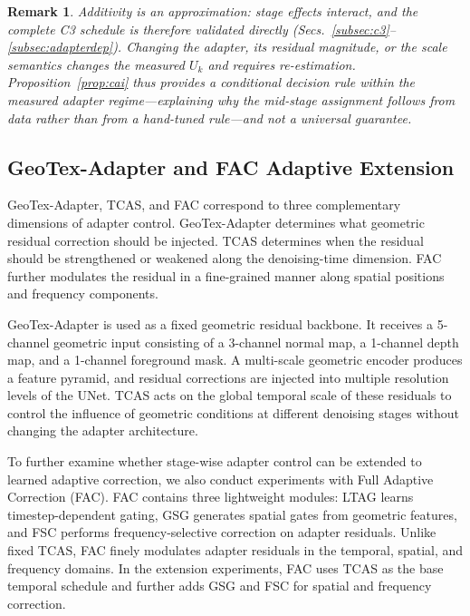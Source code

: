 \documentclass[times,twocolumn,final]{elsarticle}
\newtheorem{remark}{Remark} %
\providecommand{\DIFadd}[1]{{\protect\color{blue} \sf #1}} %
\providecommand{\DIFaddend}{} %
\DeclareRobustCommand{\DIFaddend}{\DIFOaddend \let\includegraphics\DIFOincludegraphics} %
\begin{document}
\begin{remark}
\DIFadd{Additivity is an approximation: stage effects interact, and the complete C3 schedule is therefore validated directly (Secs.~\ref{subsec:c3}--\ref{subsec:adapterdep}). Changing the adapter, its residual magnitude, or the scale semantics changes the measured $U_k$ and requires re-estimation. Proposition~\ref{prop:cai} thus provides a conditional decision rule within the measured adapter regime---explaining why the mid-stage assignment follows from data rather than from a hand-tuned rule---and not a universal guarantee.
}\end{remark}

\DIFaddend \subsection{GeoTex-Adapter and FAC Adaptive Extension}
\label{subsec:fac}

GeoTex-Adapter, TCAS, and FAC correspond to three complementary dimensions of adapter control. GeoTex-Adapter determines what geometric residual correction should be injected. TCAS determines when the residual should be strengthened or weakened along the denoising-time dimension. FAC further modulates the residual in a fine-grained manner along spatial positions and frequency components.

GeoTex-Adapter is used as a fixed geometric residual backbone. It receives a 5-channel geometric input consisting of a 3-channel normal map, a 1-channel depth map, and a 1-channel foreground mask. A multi-scale geometric encoder produces a feature pyramid, and residual corrections are injected into multiple resolution levels of the UNet. TCAS acts on the global temporal scale of these residuals to control the influence of geometric conditions at different denoising stages without changing the adapter architecture.

To further examine whether stage-wise adapter control can be extended to learned adaptive correction, we also conduct experiments with Full Adaptive Correction (FAC). FAC contains three lightweight modules: LTAG learns timestep-dependent gating, GSG generates spatial gates from geometric features, and FSC performs frequency-selective correction on adapter residuals. Unlike fixed TCAS, FAC finely modulates adapter residuals in the temporal, spatial, and frequency domains. In the extension experiments, FAC uses TCAS as the base temporal schedule and further adds GSG and FSC for spatial and frequency correction.
\end{document}
